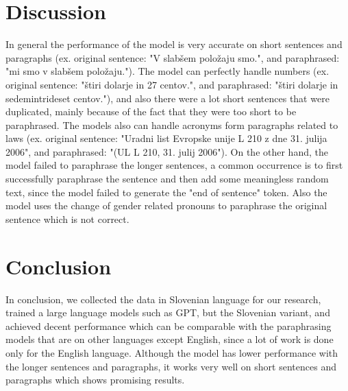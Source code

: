 \documentclass[fleqn,moreauthors,10pt]{ds_report}
\begin{document}
\section*{Discussion}
In general the performance of the model is very accurate on short sentences and paragraphs (ex. original sentence: "V slab\v{s}em polo\v{z}aju smo.", and paraphrased: "mi smo v slab\v{s}em polo\v{z}aju."). The model can perfectly handle numbers (ex. original sentence: "\v{s}tiri dolarje in 27 centov.", and paraphrased: "\v{s}tiri dolarje in sedemintrideset centov."), and also there were a lot short sentences that were duplicated, mainly because of the fact that they were too short to be paraphrased. The models also can handle acronyms form paragraphs related to laws (ex. original sentence: "Uradni list Evropske unije L 210 z dne 31. julija 2006", and paraphrased: "(UL L 210, 31. julij 2006"). On the other hand, the model failed to paraphrase the longer sentences, a common occurrence is to first successfully paraphrase the sentence and then add some meaningless random text, since the model failed to generate the "end of sentence" token. Also the model uses the change of gender related pronouns to paraphrase the original sentence which is not correct.








\section*{Conclusion}
In conclusion, we collected the data in Slovenian language for our research, trained a large language models such as GPT, but the Slovenian variant, and achieved decent performance which can be comparable with the paraphrasing models that are on other languages except English, since a lot of work is done only for the English language. Although the model has lower performance with the longer sentences and paragraphs, it works very well on short sentences and paragraphs which shows promising results.
\end{document}
